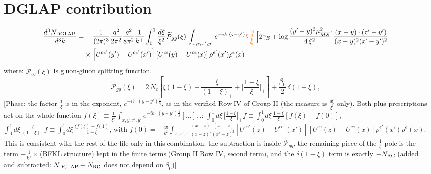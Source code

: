 \documentclass[9pt]{article}
\numberwithin{equation}{section}
\begin{document}
\section{DGLAP contribution}
\begin{align}
\frac{d^{3}N_{\rm DGLAP}}{d^{3}k}= &-\frac{1}{(2\pi)^{3}}\frac{g^{2}}{2\pi^{2}}\frac{g^{2}}{8\pi^{2}}\frac{1}{k^{+}}\int_{0}^{1}\frac{d\xi}{\xi^{2}}\,\widetilde{\mathcal P}_{gg}(\xi)\,\int_{x,y,x',y'}e^{-ik\cdot(y-y'){\color{red}\frac{1}{\xi}}}{\color{orange}\cancel{\frac{1}{\xi}}}\,\Big[2\gamma_{E}+\log\frac{(y'-y)^{2}\mu^{2}_{\overline{MS}}}{4\,\xi^{2}}\Big]\frac{(x-y)\cdot(x'-y')}{(x-y)^{2}(x'-y')^{2}}\notag\\
&\times\left[U^{ce'}(y') - U^{ce'}(x')\right]\left[U^{ce}(y) - U^{ce}(x)\right]\rho^{e'}(x')\rho^{e}(x)
\end{align}
where:
$\widetilde{\mathcal{P}}_{gg}(\xi)$ is gluon-gluon splitting function.
$$\widetilde{\mathcal{P}}_{gg}(\xi) = 2\,N_{c}\left[\xi(1-\xi) + \frac{\xi}{(1-\xi)_{+}} + \Big[\frac{1-\xi}{\xi}\Big]_{+}\right]+\frac{\beta_{0}}{2}\,\delta(1-\xi),$$ {\color{red}[Phase: the factor $\frac{1}{\xi}$ is in the exponent, $e^{-ik\cdot(y-y')\frac{1}{\xi}}$, as in the verified Row IV of Group II (the measure is $\frac{d\xi}{\xi^{2}}$ only). Both plus prescriptions act on the whole function $f(\xi)\equiv\frac{1}{\xi^{2}}\int_{x,y,x',y'}e^{-ik\cdot(y-y')\frac{1}{\xi}}[\dots]\dots$: $\int_{0}^{1}d\xi\,\big[\frac{1-\xi}{\xi}\big]_{+}f\equiv\int_{0}^{1}d\xi\,\frac{1-\xi}{\xi}[f(\xi)-f(0)]$, $\int_{0}^{1}d\xi\,\frac{\xi}{(1-\xi)_{+}}f\equiv\int_{0}^{1}d\xi\,\frac{\xi f(\xi)-f(1)}{1-\xi}$, with $f(0)=-\frac{4\pi}{k^{2}}\int_{x,x',z}\frac{(x-z)\cdot(x'-z)}{(x-z)^{2}(x'-z)^{2}}[U^{ce'}(z)-U^{ce'}(x')][U^{ce}(z)-U^{ce}(x)]\rho^{e'}(x')\rho^{e}(x)$. This is consistent with the rest of the file only in this combination: the subtraction is inside $\widetilde{\mathcal P}_{gg}$, the remaining piece of the $\frac{1}{\xi}$ pole is the term $-\frac{1}{k^{+}}\times$(BFKL structure) kept in the finite terms (Group II Row IV, second term), and the $\delta(1-\xi)$ term is exactly $-N_{\rm RC}$ (added and subtracted: $N_{\rm DGLAP}+N_{\rm RC}$ does not depend on $\beta_{0}$)]}\par\noindent
\end{document}
